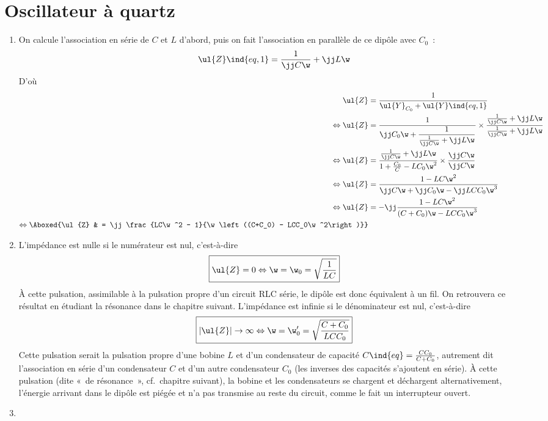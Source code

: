 \documentclass[a4paper, 12pt, final, garamond]{book}
\begin{document}
\section{Oscillateur à quartz}
\begin{enumerate}
	\item On calcule l'association en série de $C$ et $L$ d'abord, puis on fait
	      l'association en parallèle de ce dipôle avec $C_0$~:
	      \begin{gather*}
		      \ul{Z}\ind{eq, 1} = \frac{1}{\jj C\w} + \jj L \w
	      \end{gather*}
	      D'où
	      \begin{align*}
		      \ul{Z}
		       & = \frac{1}{\ul{Y}_{C_0} + \ul{Y}\ind{eq, 1}}                   \\
		      \Leftrightarrow
		      \ul{Z}
		       & = \frac{1}{\jj C_0\w + \dfrac{1}{\frac{1}{\jj C\w} + \jj L\w}}
		      \times
		      \frac{\frac{1}{\jj C\w} + \jj L\w}{\frac{1}{\jj C\w} + \jj
		      L\w}                                                              \\
		      \Leftrightarrow
		      \ul{Z}
		       & = \frac{\frac{1}{\jj C\w} + \jj L\w}{1 + \frac{C_0}{C} -
			      LC_0\w^2}
		      \times
		      \frac{\jj C\w}{\jj C\w}                                           \\
		      \Leftrightarrow
		      \ul{Z}
		       & = \frac{1 - LC\w^2}{\jj C\w + \jj C_0\w -\jj LCC_0\w^3}        \\
		      \Leftrightarrow
		      \ul{Z}
		       & = -\jj \frac{1 - LC\w^2}{(C+C_0)\w - LCC_0\w^3}                \\
		      \Leftrightarrow
		      \Aboxed{\ul{Z}
		       & = \jj \frac{LC\w^2 - 1}{\w\left((C+C_0) - LCC_0\w^2\right)}}
	      \end{align*}
	\item L'impédance est nulle si le numérateur est nul, c'est-à-dire
	      \[\boxed{\ul{Z} = 0 \Leftrightarrow \w = \w_0 = \sqrt{\frac{1}{LC}}}\]
	      À cette pulsation, assimilable à la pulsation propre d'un circuit RLC
	      série, le dipôle est donc équivalent à un fil. On retrouvera ce
	      résultat en étudiant la résonance dans le chapitre suivant. \bigbreak
	      L'impédance est infinie si le dénominateur est nul, c'est-à-dire
	      \[\boxed{|\ul{Z}| \rightarrow \infty \Leftrightarrow \w = \w_0' =
			      \sqrt{\frac{C+C_0}{LCC_0}}}\]
	      Cette pulsation serait la pulsation propre d'une bobine $L$ et d'un
	      condensateur de capacité $C\ind{eq} = \frac{CC_0}{C+C_0}$, autrement dit
	      l'association en série d'un condensateur $C$ et d'un autre condensateur
	      $C_0$ (les inverses des capacités s'ajoutent en série). \smallbreak
	      À cette pulsation (dite «~de résonance~», cf.\ chapitre suivant), la
	      bobine et les condensateurs se chargent et déchargent alternativement,
	      l'énergie arrivant dans le dipôle est piégée et n'a pas transmise au
	      reste du circuit, comme le fait un interrupteur ouvert.
	      \item~


\end{enumerate}
\end{document}
